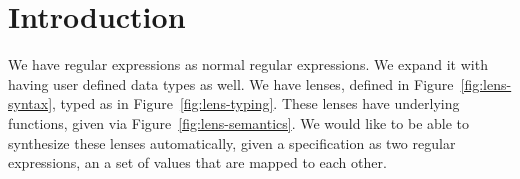 
\section{Introduction}





We have regular expressions as normal regular expressions.
We expand it with having user defined data types as well.
We have lenses, defined in Figure~\ref{fig:lens-syntax}, typed as in Figure~\ref{fig:lens-typing}.
These lenses have underlying functions, given via Figure~\ref{fig:lens-semantics}.
We would like to be able to synthesize these lenses automatically, given a
specification as two regular expressions, an a set of values that are
mapped to each other.
